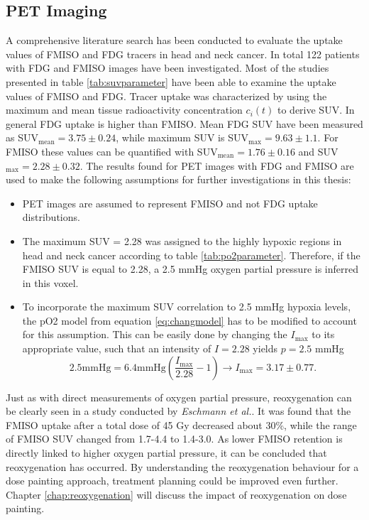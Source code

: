 \subsection{PET Imaging}\label{chap:petimaging}
A comprehensive literature search has been conducted to evaluate the uptake values of FMISO and FDG tracers in head and neck cancer. In total 122 patients with FDG and FMISO images have been investigated. Most of the studies presented in table \ref{tab:suvparameter} have been able to examine the uptake values of FMISO and FDG. Tracer uptake was characterized by using the maximum and mean tissue radioactivity concentration $c_i(t)$ to derive SUV. In general FDG uptake is higher than FMISO. Mean FDG SUV have been measured as SUV$_\mathrm{mean}=3.75 \pm 0.24$, while maximum SUV is  SUV$_\mathrm{max}=9.63 \pm 1.1$. For FMISO these values can be quantified with SUV$_\mathrm{mean}=1.76 \pm 0.16$ and SUV$_\mathrm{max}=2.28 \pm 0.32$. The results found for PET images with FDG and FMISO are used to make the following assumptions for further investigations in this thesis:
\begin{itemize}
\item PET images are assumed to represent FMISO and not FDG uptake distributions.
\item The maximum SUV = 2.28 was assigned to the highly hypoxic regions in head and neck cancer according to table \ref{tab:po2parameter}. Therefore, if the FMISO SUV is equal to 2.28, a 2.5 mmHg oxygen partial pressure is inferred in this voxel.
\item To incorporate the maximum SUV correlation to 2.5 mmHg hypoxia levels, the pO2 model from equation \ref{eq:changmodel} has to be modified to account for this assumption. This can be easily done by changing the $I_\mathrm{max}$ to its  appropriate value, such that an intensity of $I=2.28$ yields $p=2.5$ mmHg
\begin{equation}\label{eq:gaugedchang}
2.5\mathrm{mmHg} = 6.4\mathrm{mmHg}\left(\frac{I_\mathrm{max}}{2.28}-1\right) \rightarrow I_\mathrm{max} = 3.17 \pm 0.77.
\end{equation}
\end{itemize}
Just as with direct measurements of oxygen partial pressure, reoxygenation can be clearly seen in a study conducted by \textit{Eschmann et al.}\cite{pmid17543402}. It was found that the FMISO uptake after a total dose of 45 Gy decreased about 30\%, while the range of FMISO SUV changed from 1.7-4.4 to 1.4-3.0. As lower FMISO retention is directly linked to higher oxygen partial pressure, it can be concluded that reoxygenation has occurred. By understanding the reoxygenation behaviour for a dose painting approach, treatment planning could be improved even further. Chapter \ref{chap:reoxygenation} will discuss the impact of reoxygenation on dose painting.
